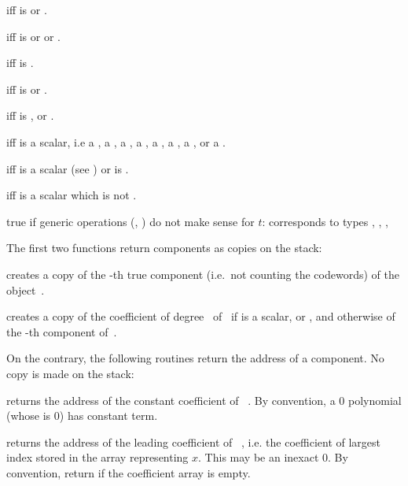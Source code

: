   iff  is 
or .

  iff  is 
or  or .

  iff  is .

  iff  is 
or .

  iff  is , 
or .

  iff  is a scalar, i.e
a ,
a ,
a ,
a ,
a ,
a ,
a ,
or
a .

  iff  is a scalar (see
) or  is .

  iff  is a scalar which is not
.

 true if generic operations (,
) do not make sense for $t$: corresponds to types
, , , 

\label{se:accessors}
The first two functions return  components as copies on the stack:

 creates a copy of the -th true
component (i.e.\ not counting the codewords) of the object~.

 creates a copy of the coefficient of
degree~ of~ if  is a scalar,  or ,
and otherwise of the -th component of~.
\smallskip

\noindent On the contrary, the following routines return the address of a
 component. No copy is made on the stack:

 returns the address of the constant
coefficient of ~. By convention, a $0$ polynomial (whose
 is $0$) has  constant term.

 returns the address of the leading coefficient
of ~, i.e. the coefficient of largest index stored in the
array representing $x$. This may be an inexact $0$. By convention, return
 if the coefficient array is empty.

